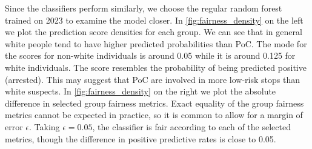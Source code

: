 Since the classifiers perform similarly, we choose the regular random forest trained on 2023 to examine the model closer.
In \autoref{fig:fairness_density} on the left we plot the prediction score densities for each group. We can see that in general white people tend to have higher predicted probabilities than PoC. The mode for the scores for non-white individuals is around 0.05 while it is around 0.125 for white individuals. The score resembles the probability of being predicted positive (arrested). This may suggest that PoC are involved in more low-risk stops than white suspects. In \autoref{fig:fairness_density} on the right we plot the absolute difference in selected group fairness metrics.
Exact equality of the group fairness metrics cannot be expected in practice, so it is common to allow for a margin of error $\epsilon$. Taking $\epsilon = 0.05$, the classifier is fair according to each of the selected metrics, though the difference in positive predictive rates is close to 0.05.\par
